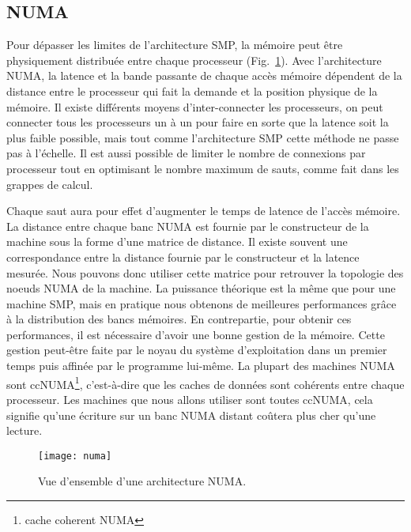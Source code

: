 \subsection{NUMA}
Pour dépasser les limites de l'architecture SMP, la mémoire peut être physiquement distribuée entre chaque processeur (Fig.~\ref{fig:numa}).
%
Avec l'architecture NUMA, la latence et la bande passante de chaque accès mémoire dépendent de la distance entre le processeur qui fait la demande et la position physique de la mémoire.
%
Il existe différents moyens d'inter-connecter les processeurs, on peut connecter tous les processeurs un à un pour faire en sorte que la latence soit la plus faible possible, mais tout comme l'architecture SMP cette méthode ne passe pas à l'échelle.
%
Il est aussi possible de limiter le nombre de connexions par processeur tout en optimisant le nombre maximum de sauts, comme fait dans les grappes de calcul.



Chaque saut aura pour effet d'augmenter le temps de latence de l'accès mémoire.
%
La distance entre chaque banc NUMA est fournie par le constructeur de la machine sous la forme d'une matrice de distance.
%
Il existe souvent une correspondance entre la distance fournie par le constructeur et la latence mesurée.
%
Nous pouvons donc utiliser cette matrice pour retrouver la topologie des noeuds NUMA de la machine.
%
La puissance théorique est la même que pour une machine SMP, mais en pratique nous obtenons de meilleures performances grâce à la distribution des bancs mémoires.
%
En contrepartie, pour obtenir ces performances, il est nécessaire d'avoir une bonne gestion de la mémoire.
%
Cette gestion peut-être faite par le noyau du système d'exploitation dans un premier temps puis affinée par le programme lui-même.
%
La plupart des machines NUMA sont ccNUMA\footnote{cache coherent NUMA}, c'est-à-dire que les caches de données sont cohérents entre chaque processeur.
%
Les machines que nous allons utiliser sont toutes ccNUMA, cela signifie qu'une écriture sur un banc NUMA distant coûtera plus cher qu'une lecture.

\begin{figure}[!h]
  \centering
  \texttt{[image: numa]}
  \caption{Vue d'ensemble d'une architecture NUMA.}
  \label{fig:numa}
\end{figure}
